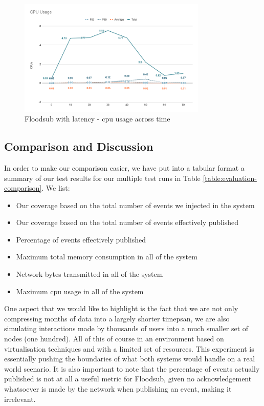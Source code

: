 \begin{figure}[!htb]
  \centering
  \includegraphics[width=0.8\textwidth]{img/graph-floodsub-cpu.png}
  \caption{Floodsub with latency - \acrshort{cpu} usage across time}
  \label{fig:graph-floodsub-latency-cpu}
\end{figure}

\subsection{Comparison and Discussion}\label{subsec:comparison}

In order to make our comparison easier, we have put into a tabular format a
summary of our test results for our multiple test runs in Table
\ref{table:evaluation-comparison}. We list:

\begin{itemize}
  \item Our coverage based on the total number of events we injected in the
    system
  \item Our coverage based on the total number of events effectively published
  \item Percentage of events effectively published
  \item Maximum total memory consumption in all of the system
  \item Network bytes transmitted in all of the system
  \item Maximum \acrshort{cpu} usage in all of the system
\end{itemize}

One aspect that we would like to highlight is the fact that we are not only
compressing months of data into a largely shorter timepsan, we are also
simulating interactions made by thousands of users into a much smaller set of
nodes (one hundred). All of this of course in an environment based on
virtualisation techniques and with a limited set of resources. This experiment
is essentially pushing the boundaries of what both systems would handle on a
real world scenario. It is also important to note that the percentage of events
actually published is not at all a useful metric for Floodsub, given no
acknowledgement whatsoever is made by the network when publishing an event,
making it irrelevant.

